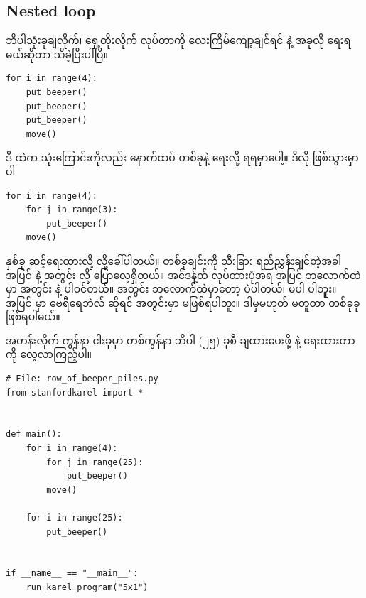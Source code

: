 \subsection*{Nested  loop}
%
\setlength{\fboxsep}{0pt}
ဘိပါသုံးခုချလိုက်၊ ရှေ့တိုးလိုက် လုပ်တာကို လေးကြိမ်ကျော့ချင်ရင်   နဲ့ အခုလို ရေးရမယ်ဆိုတာ သိခဲ့ပြီးပါပြီ။
\begin{verbatim}
for i in range(4):
    put_beeper()
    put_beeper()
    put_beeper()
    move()
\end{verbatim}
%
ဒီ   ထဲက  သုံးကြောင်းကိုလည်း နောက်ထပ်  တစ်ခုနဲ့ ရေးလို့ ရရမှာပေါ့။ ဒီလို ဖြစ်သွားမှာပါ
%
\setlength{\fboxsep}{0pt}
\begin{verbatim}
for i in range(4):
    for j in range(3):
        put_beeper()
    move()
\end{verbatim}
%
  နှစ်ခု ဆင့်ရေးထားလို့    လို့ခေါ်ပါတယ်။   တစ်ခုချင်းကို သီးခြား ရည်ညွှန်းချင်တဲ့အခါ အပြင်   နဲ့ အတွင်း   လို့ ပြောလေ့ရှိတယ်။ အင်ဒန့်ထ် လုပ်ထားပုံအရ အပြင်   ဘလောက်ထဲမှာ အတွင်း   နဲ့  ပါဝင်တယ်။ အတွင်း   ဘလောက်ထဲမှာတော့  ပဲပါတယ်၊  မပါ ပါဘူး။ အပြင်   မှာ ဗေရီရေဘဲလ်  ဆိုရင် အတွင်းမှာ  မဖြစ်ရပါဘူး။ \fEn{,} ဒါမှမဟုတ်  မတူတာ  တစ်ခုခုဖြစ်ရပါမယ်။ 


အတန်းလိုက် ကွန်နာ ငါးခုမှာ တစ်ကွန်နာ ဘိပါ (၂၅) ခုစီ ချထားပေးဖို့   နဲ့ ရေးထားတာကို လေ့လာကြည့်ပါ။
%
\setlength{\fboxsep}{0pt}
\begin{verbatim}
# File: row_of_beeper_piles.py
from stanfordkarel import *


def main():
    for i in range(4):
        for j in range(25):
            put_beeper()
        move()

    for i in range(25):
        put_beeper()


if __name__ == "__main__":
    run_karel_program("5x1")
\end{verbatim}
%

